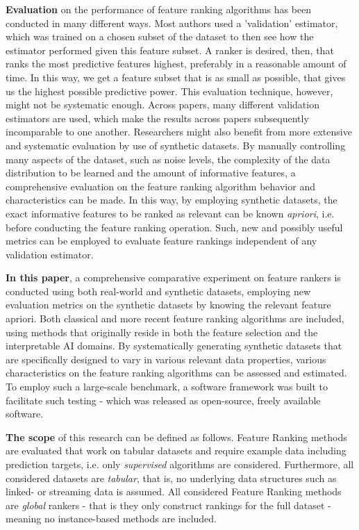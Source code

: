 \documentclass{article}
\begin{document}
\textbf{Evaluation} on the performance of feature ranking algorithms has been conducted in many different ways. Most authors used a 'validation' estimator, which was trained on a chosen subset of the dataset to then see how the estimator performed given this feature subset. A ranker is desired, then, that ranks the most predictive features highest, preferably in a reasonable amount of time. In this way, we get a feature subset that is as small as possible, that gives us the highest possible predictive power. This evaluation technique, however, might not be systematic enough. Across papers, many different validation estimators are used, which make the results across papers subsequently incomparable to one another. Researchers might also benefit from more extensive and systematic evaluation by use of synthetic datasets. By manually controlling many aspects of the dataset, such as noise levels, the complexity of the data distribution to be learned and the amount of informative features, a comprehensive evaluation on the feature ranking algorithm behavior and characteristics can be made. In this way, by employing synthetic datasets, the exact informative features to be ranked as relevant can be known \textit{apriori}, i.e. before conducting the feature ranking operation. Such, new and possibly useful metrics can be employed to evaluate feature rankings independent of any validation estimator.

\textbf{In this paper}, a comprehensive comparative experiment on feature rankers is conducted using both real-world and synthetic datasets, employing new evaluation metrics on the synthetic datasets by knowing the relevant feature apriori. Both classical and more recent feature ranking algorithms are included, using methods that originally reside in both the feature selection and the interpretable AI domains. By systematically generating synthetic datasets that are specifically designed to vary in various relevant data properties, various characteristics on the feature ranking algorithms can be assessed and estimated. To employ such a large-scale benchmark, a software framework was built to facilitate such testing - which was released as open-source, freely available software.

\textbf{The scope} of this research can be defined as follows. Feature Ranking methods are evaluated that work on tabular datasets and require example data including prediction targets, i.e. only \textit{supervised} algorithms are considered. Furthermore, all considered datasets are \textit{tabular}, that is, no underlying data structures such as linked- or streaming data is assumed. All considered Feature Ranking methods are \textit{global} rankers - that is they only construct rankings for the full dataset - meaning no instance-based methods are included.
\end{document}
